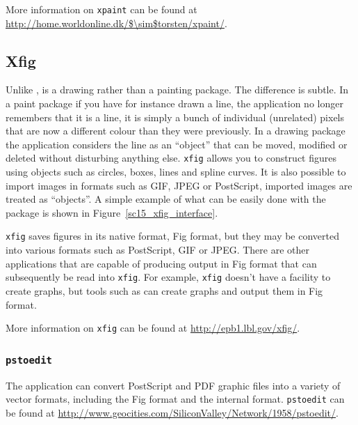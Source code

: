 \documentclass[twoside,11pt]{starlink}
\begin{document}
More information on \texttt{xpaint} can be found at \url{http://home.worldonline.dk/$\sim$torsten/xpaint/}.

\subsection{Xfig\label{sc15_xfig}}

Unlike ,  is a drawing rather than a painting
package. The difference is subtle. In a paint package if you have for
instance drawn a line, the application no longer remembers that it is
a line, it is simply a bunch of individual (unrelated) pixels that are
now a different colour than they were previously. In a drawing package
the application considers the line as an ``object'' that can be moved,
modified or deleted without disturbing anything else. \texttt{xfig}
allows you to construct figures using objects such as circles, boxes,
lines and spline curves. It is also possible to import images in
formats such as GIF, JPEG or PostScript, imported images are treated
as ``objects''. A simple example of what can be easily done with the
package is shown in Figure~\ref{sc15_xfig_interface}.


\texttt{xfig} saves figures in its native format, Fig format, but they
may be converted into various formats such as PostScript, GIF or JPEG.
There are other applications that are capable of producing output in
Fig format that can subsequently be read into \texttt{xfig}. For example,
\texttt{xfig} doesn't have a facility to create graphs, but tools such as
 can create graphs and output them in
Fig format.

More information on \texttt{xfig} can be found at \url{http://epb1.lbl.gov/xfig/}.

\subsubsection{\texttt{pstoedit}}

The 
application can convert PostScript and PDF graphic files into a
variety of vector formats, including the  Fig format and the 
internal format. \texttt{pstoedit} can be found at
\url{http://www.geocities.com/SiliconValley/Network/1958/pstoedit/}.
\end{document}
